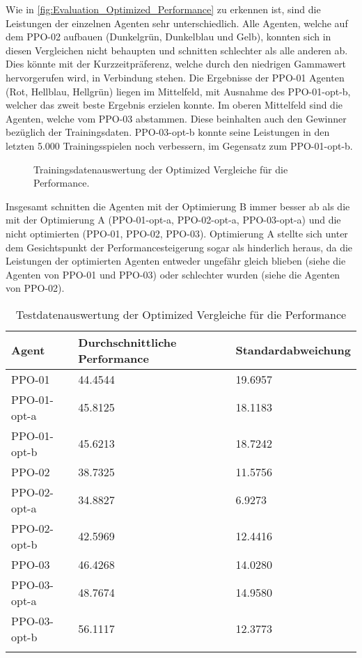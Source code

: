 Wie in \autoref{fig:Evaluation_Optimized_Performance} zu erkennen ist, sind die Leistungen der einzelnen Agenten sehr unterschiedlich. Alle Agenten, welche auf dem PPO-02 aufbauen (Dunkelgrün, Dunkelblau und Gelb), konnten sich in diesen Vergleichen nicht behaupten und schnitten schlechter als alle anderen ab. Dies könnte mit der Kurzzeitpräferenz, welche durch den niedrigen Gammawert hervorgerufen wird, in Verbindung stehen. Die Ergebnisse der PPO-01 Agenten (Rot, Hellblau, Hellgrün) liegen im Mittelfeld, mit Ausnahme des PPO-01-opt-b, welcher das zweit beste Ergebnis erzielen konnte. Im oberen Mittelfeld sind die Agenten, welche vom PPO-03 abstammen. Diese beinhalten auch den Gewinner bezüglich der Trainingsdaten. PPO-03-opt-b konnte seine Leistungen in den letzten 5.000 Trainingsspielen noch verbessern, im Gegensatz zum PPO-01-opt-b.
\begin{figure}[H]
	\centering
	
	\caption[Performance - Auswertung der Trainingsdaten der Optimized Vergleiche]{Trainingsdatenauswertung der Optimized Vergleiche für die Performance.}
	\label{fig:Evaluation_Optimized_Performance}
\end{figure}
Insgesamt schnitten die Agenten mit der Optimierung B immer besser ab als die mit der Optimierung A (PPO-01-opt-a, PPO-02-opt-a, PPO-03-opt-a) und die nicht optimierten (PPO-01, PPO-02, PPO-03). Optimierung A stellte sich unter dem Gesichtspunkt der Performancesteigerung sogar als hinderlich heraus, da die Leistungen der optimierten Agenten entweder ungefähr gleich blieben (siehe die Agenten von PPO-01 und PPO-03) oder schlechter wurden (siehe die Agenten von PPO-02).
\begin{longtable}[h]{|p{4.5cm}|p{4.5cm}|p{4.5cm}|}
	\hline
	Agent & Durchschnittliche Performance & Standardabweichung \\
	\hline
	PPO-01 & 44.4544 & 19.6957 \\ 
	\hline
	PPO-01-opt-a & 45.8125 & 18.1183 \\ 
	\hline
	PPO-01-opt-b & 45.6213 & 18.7242 \\ 
	\hline
	PPO-02 & 38.7325 & 11.5756 \\ 
	\hline
	PPO-02-opt-a & 34.8827 & 6.9273 \\ 
	\hline
	PPO-02-opt-b & 42.5969 & 12.4416 \\ 
	\hline
	PPO-03 & 46.4268 & 14.0280 \\ 
	\hline
	PPO-03-opt-a & 48.7674 & 14.9580 \\ 
	\hline
	PPO-03-opt-b & 56.1117 & 12.3773 \\ 
	\hline
	\caption{Testdatenauswertung der Optimized Vergleiche für die Performance}
	\label{tab:Evaluation_Testdaten_Performance_Optimized} 
\end{longtable}
